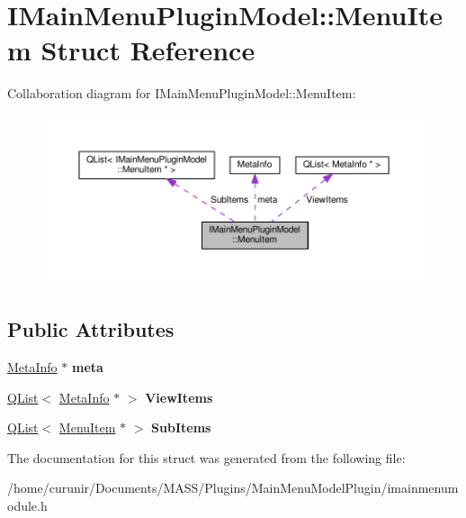 \hypertarget{struct_i_main_menu_plugin_model_1_1_menu_item}{}\section{I\+Main\+Menu\+Plugin\+Model\+:\+:Menu\+Item Struct Reference}
\label{struct_i_main_menu_plugin_model_1_1_menu_item}


Collaboration diagram for I\+Main\+Menu\+Plugin\+Model\+:\+:Menu\+Item\+:\nopagebreak
\begin{figure}[H]
\begin{center}
\leavevmode
\includegraphics[width=350pt]{struct_i_main_menu_plugin_model_1_1_menu_item__coll__graph}
\end{center}
\end{figure}
\subsection*{Public Attributes}
\begin{DoxyCompactItemize}
\item 
\hyperlink{struct_meta_info}{Meta\+Info} $\ast$ {\bfseries meta}
\item 
\hyperlink{class_q_list}{Q\+List}$<$ \hyperlink{struct_meta_info}{Meta\+Info} $\ast$ $>$ {\bfseries View\+Items}
\item 
\hyperlink{class_q_list}{Q\+List}$<$ \hyperlink{struct_i_main_menu_plugin_model_1_1_menu_item}{Menu\+Item} $\ast$ $>$ {\bfseries Sub\+Items}
\end{DoxyCompactItemize}


The documentation for this struct was generated from the following file\+:\begin{DoxyCompactItemize}
\item 
/home/curunir/\+Documents/\+M\+A\+S\+S/\+Plugins/\+Main\+Menu\+Model\+Plugin/imainmenumodule.\+h\end{DoxyCompactItemize}
